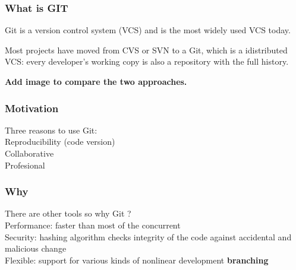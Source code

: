 

\begin{frame}
\frametitle{What is GIT}

Git is a version control system (VCS) and is the most widely used VCS today.

Most projects have moved from CVS or SVN to a Git, which is a idistributed VCS: 
every developer's working copy is also a repository with the full history.

\textbf{Add image to compare the two approaches.}

\end{frame}


\begin{frame}
\frametitle{Motivation}
Three reasons to use Git:\\
    Reproducibility (code version)\\
    Collaborative\\
    Profesional \\
\end{frame}


\begin{frame}
\frametitle{Why}
There are other tools so why Git ?\\

Performance: faster than most of the concurrent \\
Security: hashing algorithm checks integrity of the code against accidental and
malicious change\\
Flexible: support for various kinds of nonlinear development \textbf{branching}\\
\end{frame}


